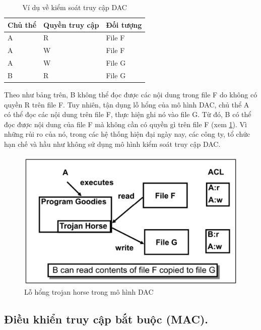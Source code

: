 \begin{table}[ht]
    \centering
    \caption{Ví dụ về kiểm soát truy cập DAC}
    \label{tab:chap2-dac-example}
    \begin{tabular}{| p{} | p{} | p{} |}
        \hline
        \textbf{Chủ thể} & \textbf{Quyền truy cập} & \textbf{Đối tượng} \\
        \hline
        A & R & File F \\
        \hline
        A & W & File F \\
        \hline
        A & W & File G \\
        \hline
        B & R & File G \\
        \hline
    \end{tabular}
\end{table}
Theo như bảng trên, B không thể đọc được các nội dung trong file F do không có
quyền R trên file F. Tuy nhiên, tận dụng lỗ hổng của mô hình DAC, chủ thể A có thể
đọc các nội dung trên file F, thực hiện ghi nó vào file G. Từ đó, B có thể đọc được nội
dung của file F mà không cần có quyền gì trên file F (xem \ref{fig:chap2-troyjan-dac}). Vì những rủi ro của nó, trong các hệ thống hiện đại ngày nay, các công ty, tổ chức
hạn chế và hầu như không sử dụng mô hình kiểm soát truy cập DAC. \\
\begin{figure}
    \centering
    \includegraphics[scale=0.5]{graphics/chapter-2/chap2-troyjan-dac.png}
    \caption{Lỗ hổng trojan horse trong mô hình DAC \cite{sandhu1996role}}
    \label{fig:chap2-troyjan-dac}
\end{figure}
\subsection{Điều khiển truy cập bắt buộc (MAC).}

